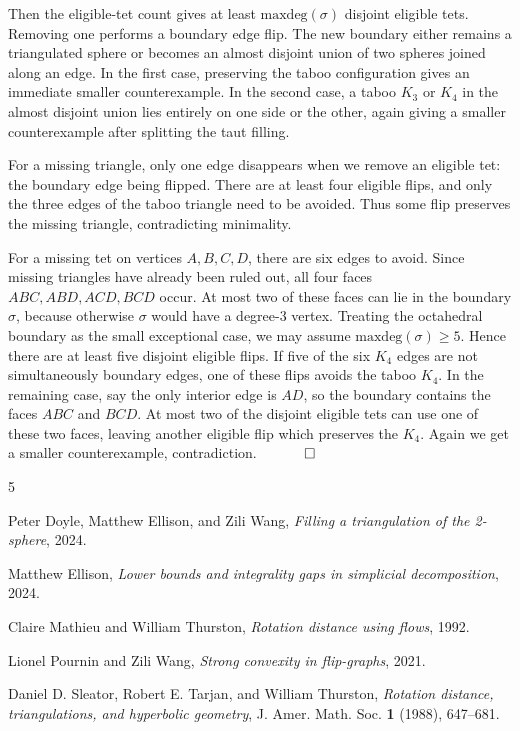 \documentclass[12pt]{article}
\newcommand{\proofend}{$\quad \qed$}
\newcommand{\kw}{\mathrm}
\newcommand{\maxdeg}{\kw{maxdeg}}
\begin{document}
Then the eligible-tet count gives at least $\maxdeg(\sigma)$ disjoint eligible
tets.  Removing one performs a boundary edge flip.  The new boundary either
remains a triangulated sphere or becomes an almost disjoint union of two
spheres joined along an edge.  In the first case, preserving the taboo
configuration gives an immediate smaller counterexample.  In the second case,
a taboo $K_3$ or $K_4$ in the almost disjoint union lies entirely on one side
or the other, again giving a smaller counterexample after splitting the taut
filling.

For a missing triangle, only one edge disappears when we remove an eligible
tet: the boundary edge being flipped.  There are at least four eligible flips,
and only the three edges of the taboo triangle need to be avoided.  Thus some
flip preserves the missing triangle, contradicting minimality.

For a missing tet on vertices $A,B,C,D$, there are six edges to avoid.  Since
missing triangles have already been ruled out, all four faces
$ABC,ABD,ACD,BCD$ occur.  At most two of these faces can lie in the boundary
$\sigma$, because otherwise $\sigma$ would have a degree-$3$ vertex.  Treating
the octahedral boundary as the small exceptional case, we may assume
$\maxdeg(\sigma)\geq 5$.  Hence there are at least five disjoint eligible
flips.  If five of the six $K_4$ edges are not simultaneously boundary edges,
one of these flips avoids the taboo $K_4$.  In the remaining case, say the
only interior edge is $AD$, so the boundary contains the faces $ABC$ and
$BCD$.  At most two of the disjoint eligible tets can use one of these two
faces, leaving another eligible flip which preserves the $K_4$.  Again we get
a smaller counterexample, contradiction.
\proofend

\begin{thebibliography}{5}

Peter Doyle, Matthew Ellison, and Zili Wang,
\emph{Filling a triangulation of the 2-sphere}, 2024.

Matthew Ellison,
\emph{Lower bounds and integrality gaps in simplicial decomposition}, 2024.

Claire Mathieu and William Thurston,
\emph{Rotation distance using flows}, 1992.

Lionel Pournin and Zili Wang,
\emph{Strong convexity in flip-graphs}, 2021.

Daniel D. Sleator, Robert E. Tarjan, and William Thurston,
\emph{Rotation distance, triangulations, and hyperbolic geometry},
J. Amer. Math. Soc. \textbf{1} (1988), 647--681.

\end{thebibliography}
\end{document}
